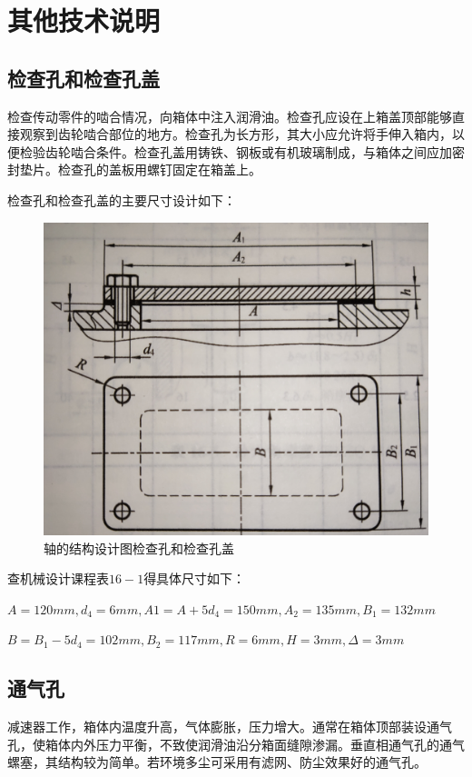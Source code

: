 \section{其他技术说明}
\subsection{检查孔和检查孔盖}
检查传动零件的啮合情况，向箱体中注入润滑油。检查孔应设在上箱盖顶部能够直接观察到齿轮啮合部位的地方。检查孔为长方形，其大小应允许将手伸入箱内，以便检验齿轮啮合条件。检查孔盖用铸铁、钢板或有机玻璃制成，与箱体之间应加密封垫片。检查孔的盖板用螺钉固定在箱盖上。

检查孔和检查孔盖的主要尺寸设计如下：
\begin{figure}[h]
    \centering
    \includegraphics[scale=0.1]{graphic/10-1.jpg}
    \caption{轴的结构设计图检查孔和检查孔盖}
\end{figure}
查机械设计课程表$16-1$得具体尺寸如下：

$A=120mm,d_4=6mm,A1=A+5d_4=150mm,A_2=135mm,B_1=132mm$

$B=B_1-5d_4=102mm,B_2=117mm,R=6mm,H=3mm,\Delta=3mm$
\subsection{通气孔}
减速器工作，箱体内温度升高，气体膨胀，压力增大。通常在箱体顶部装设通气孔，使箱体内外压力平衡，不致使润滑油沿分箱面缝隙渗漏。垂直相通气孔的通气螺塞，其结构较为简单。若环境多尘可采用有滤网、防尘效果好的通气孔。

